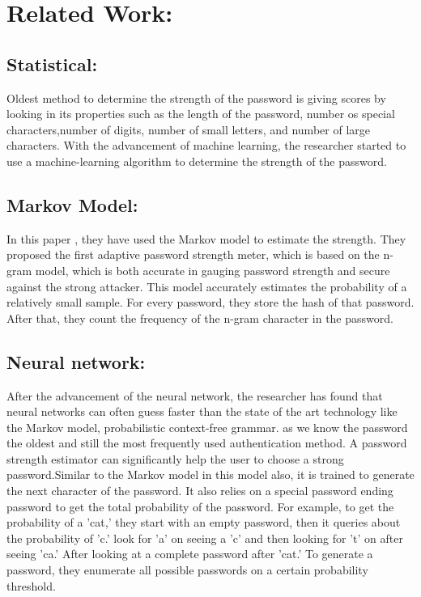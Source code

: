 \documentclass[runningheads]{llncs}
\begin{document}
\section{Related Work:}
\subsection{Statistical:}Oldest method to determine the strength of the password is giving scores by looking in its properties such as the length of the password, number os special characters,number of digits, number of small letters, and number of large characters. With the advancement of machine learning, the researcher started to use a machine-learning algorithm to determine the strength of the password.
\subsection{Markov Model:}
In this paper \cite{Castelluccia2012AdaptivePM}, they have used the Markov model to estimate the strength. They proposed the first adaptive password strength meter, which is based on the n-gram model, which is both accurate in gauging password strength and secure against the strong attacker. This model accurately estimates the probability of a relatively small sample. For every password, they store the hash of that password. After that, they count the frequency of the n-gram character in the password.
\subsection{Neural network:}
After the advancement of the neural network, the researcher has found that neural networks can often guess faster than the state of the art technology like the Markov model, probabilistic context-free grammar.\cite{197243} as we know the password the oldest and still the most frequently used authentication method. A password strength estimator can significantly help the user to choose a strong password.Similar to the Markov model in this model also, it is trained to generate the next character of the password. It also relies on a special password ending password to get the total probability of the password.
For example, to get the probability of a 'cat,' they start with an empty password, then it queries about the probability of 'c.' look for 'a' on seeing a 'c' and then looking for 't' on after seeing 'ca.' After looking at a complete password after 'cat.'
To generate a password, they enumerate all possible passwords on a certain probability threshold.
\end{document}
